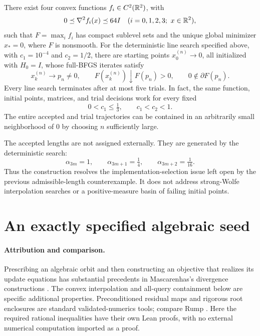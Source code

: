 \begin{theorem}\label{D:main}
There exist four convex functions $f_i\in C^2(\mathbb R^2)$, with
\[
 0\preceq\nabla^2 f_i(x)\preceq64I \quad(i=0,1,2,3;\ x\in\mathbb R^2),
\]
such that $F=\max_i f_i$ has compact sublevel sets and the unique global minimizer $x_*=0$, where $F$ is nonsmooth. For the deterministic line search specified above, with $c_1=10^{-4}$ and $c_2=1/2$, there are starting points $x_0^{(n)}\to0$, all initialized with $H_0=I$, whose full-BFGS iterates satisfy
\[
 x_k^{(n)}\longrightarrow p_n\ne0,\qquad
 F(x_k^{(n)})\downarrow F(p_n)>0,\qquad 0\notin\partial F(p_n).
\]
Every line search terminates after at most five trials. In fact, the same function, initial points, matrices, and trial decisions work for every fixed
\[
 0<c_1\le\tfrac13,\qquad c_1<c_2<1.
\]
The entire accepted and trial trajectories can be contained in an arbitrarily small neighborhood of $0$ by choosing $n$ sufficiently large.
\end{theorem}

The accepted lengths are not assigned externally. They are generated by the deterministic search:
\[
 \boxed{\alpha_{3m}=1,\qquad\alpha_{3m+1}=\tfrac14,\qquad\alpha_{3m+2}=\tfrac1{16}.}
\]
Thus the construction resolves the implementation-selection issue left open by the previous admissible-length counterexample. It does not address strong-Wolfe interpolation searches or a positive-measure basin of failing initial points.


\setcounter{section}{1}
\setcounter{theorem}{1}
\setcounter{lemma}{0}
\setcounter{corollary}{0}
\setcounter{proposition}{0}
\setcounter{remark}{0}
\setcounter{equation}{1}
\section{An exactly specified algebraic seed}
\paragraph{Attribution and comparison.}
Prescribing an algebraic orbit and then constructing an objective that realizes its update equations has substantial precedents in Mascarenhas's divergence constructions \cite{NEG_M04,NEG_M07,NEG_M14}. The convex interpolation and all-query containment below are specific additional properties. Preconditioned residual maps and rigorous root enclosures are standard validated-numerics tools; compare Rump \cite[Section 13.2, Theorem 13.3]{NEG_RUMP10}. Here the required rational inequalities have their own Lean proofs, with no external numerical computation imported as a proof.

